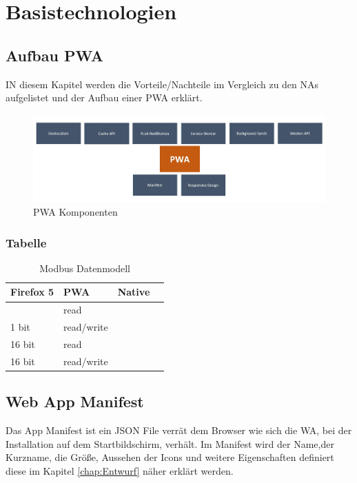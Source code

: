 \chapter{Basistechnologien}
\thispagestyle{standard}
\pagestyle{standard}
\renewcommand{\footrulewidth}{0.4pt}

\section{Aufbau PWA}
IN diesem Kapitel werden die Vorteile/Nachteile im Vergleich zu den \acl{NA}s aufgelistet und der Aufbau einer \acs{PWA} erklärt.  

  \begin{figure}[h]
	\centering
	\includegraphics[width=14cm]{BilderAllgemein/PWA_Features}\medskip
	\caption{PWA Komponenten}
	\label{fig:Komponenten}
\end{figure}

\subsection{Tabelle}



\begin{table}[h]
\centering
\begin{tabular}{|l|l|l|l|}
\hline\multirow{3}{*}{Firefox 5}
	         &PWA  & Native & 	\\ \hline
   			
   				  & read 		\\	\hline
				1 bit  & read/write \\  \hline
				16 bit & read    	\\	\hline
				16 bit & read/write \\ \hline
\end{tabular}    
\caption{Modbus Datenmodell \cite{ModbusSpecification}}
\label{tab:modbusDataModel}
\end{table}



\section{Web App Manifest}
Das App Manifest ist ein JSON File verrät dem Browser wie sich die \acs{WA}, bei der Installation auf dem Startbildschirm, verhält. Im Manifest wird der Name,der Kurzname, die Größe, Aussehen der Icons und weitere Eigenschaften definiert diese im Kapitel \ref{chap:Entwurf} näher erklärt werden.

